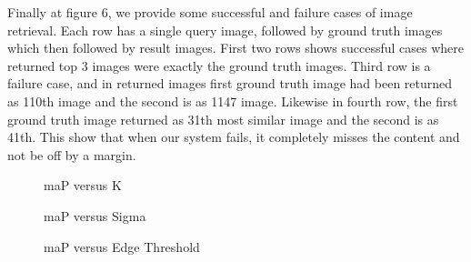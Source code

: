 \documentclass[conference,compsoc]{IEEEtran}
\begin{document}
Finally at figure 6, we provide some successful and failure cases of image retrieval. Each row has a single query image, followed by ground truth images which then followed by result images. First two rows shows successful cases where returned top 3 images were exactly the ground truth images. Third row is a failure case, and in returned images first ground truth image had been returned as 110th image and the second is as 1147 image. Likewise in fourth row, the first ground truth image returned as 31th most similar image and the second is as 41th. This show that when our system fails, it completely misses the content and not be off by a margin.

\begin{figure}
\caption{maP versus K}
\end{figure}

\begin{figure}
\caption{maP versus Sigma}
\end{figure}

\begin{figure}
\caption{maP versus Edge Threshold}
\end{figure}
\end{document}
